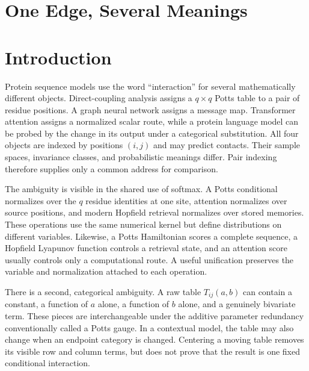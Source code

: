 \documentclass[10pt]{article}
\theoremstyle{definition}
\theoremstyle{remark}
\newcommand{\BookPart}[1]{}
\newcommand{\BookChapter}[1]{\section{#1}}
\newcommand{\BookInsert}[1]{}
\newcommand{\BookChapterLabel}[1]{}
\begin{document}
\BookPart{Language and Foundations}
\ifdefined\BOOKMODE
\BookChapter{One Edge, Several Meanings}
\BookChapterLabel{chap:book-one-edge}
\BookInsert{chapters/01_one_edge_several_meanings}
\else
\BookChapter{Introduction}

Protein sequence models use the word ``interaction'' for several mathematically different
objects.  Direct-coupling analysis assigns a $q\times q$ Potts table to a pair of residue
positions.  A graph neural network assigns a message map.  Transformer attention assigns a
normalized scalar route, while a protein language model can be probed by the change in its output
under a categorical substitution.  All four objects are indexed by positions $(i,j)$ and may
predict contacts.  Their sample spaces, invariance classes, and probabilistic meanings differ.
Pair indexing therefore supplies only a common address for comparison.

The ambiguity is visible in the shared use of softmax.  A Potts conditional normalizes over the
$q$ residue identities at one site, attention normalizes over source positions, and modern
Hopfield retrieval normalizes over stored memories.  These operations use the same numerical
kernel but define distributions on different variables.  Likewise, a Potts Hamiltonian scores a
complete sequence, a Hopfield Lyapunov function controls a retrieval state, and an attention score
usually controls only a computational route.  A useful unification preserves the variable and
normalization attached to each operation.

There is a second, categorical ambiguity.  A raw table $T_{ij}(a,b)$ can contain a constant, a
function of $a$ alone, a function of $b$ alone, and a genuinely bivariate term.  These pieces are
interchangeable under the additive parameter redundancy conventionally called a Potts gauge.  In a
contextual model, the table may
also change when an endpoint category is changed.  Centering a moving table removes its visible row
and column terms, but does not prove that the result is one fixed conditional interaction.
\end{document}
